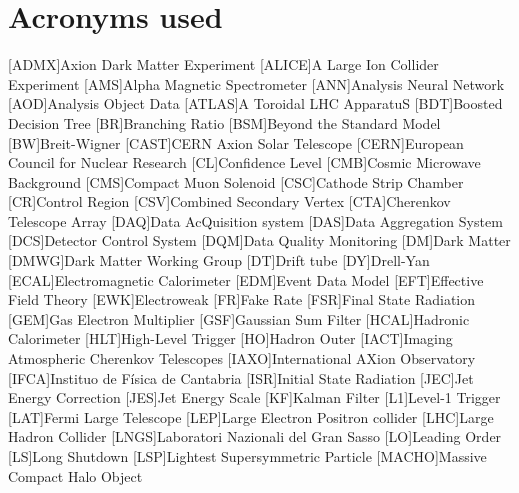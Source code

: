 \documentclass[a4paper, 10pt, openright]{report}
\begin{document}
\newpage

\chapter*{Acronyms used}
\pagestyle{plain}

\begin{multicols}{2}
\begin{acronym}

[ADMX]{Axion Dark Matter Experiment}
[ALICE]{A Large Ion Collider Experiment}
[AMS]{Alpha Magnetic Spectrometer}
[ANN]{Analysis Neural Network}
[AOD]{Analysis Object Data}
[ATLAS]{A Toroidal LHC ApparatuS}
[BDT]{Boosted Decision Tree}
[BR]{Branching Ratio}
[BSM]{Beyond the Standard Model}
[BW]{Breit-Wigner}
[CAST]{CERN Axion Solar Telescope}
[CERN]{European Council for Nuclear Research}
[CL]{Confidence Level}
[CMB]{Cosmic Microwave Background}
[CMS]{Compact Muon Solenoid}
[CSC]{Cathode Strip Chamber}
[CR]{Control Region}
[CSV]{Combined Secondary Vertex}
[CTA]{Cherenkov Telescope Array}
[DAQ]{Data AcQuisition system}
[DAS]{Data Aggregation System}
[DCS]{Detector Control System}
[DQM]{Data Quality Monitoring}
[DM]{Dark Matter}
[DMWG]{Dark Matter Working Group}
[DT]{Drift tube}
[DY]{Drell-Yan}
[ECAL]{Electromagnetic Calorimeter}
[EDM]{Event Data Model}
[EFT]{Effective Field Theory}
[EWK]{Electroweak}
[FR]{Fake Rate}
[FSR]{Final State Radiation}
[GEM]{Gas Electron Multiplier}
[GSF]{Gaussian Sum Filter}
[HCAL]{Hadronic Calorimeter}
[HLT]{High-Level Trigger}
[HO]{Hadron Outer}
[IACT]{Imaging Atmospheric Cherenkov Telescopes}
[IAXO]{International AXion Observatory}
[IFCA]{Instituo de F\'{i}sica de Cantabria}
[ISR]{Initial State Radiation}
[JEC]{Jet Energy Correction}
[JES]{Jet Energy Scale}
[KF]{Kalman Filter}
[L1]{Level-1 Trigger}
[LAT]{Fermi Large Telescope}
[LEP]{Large Electron Positron collider}
[LHC]{Large Hadron Collider}
[LNGS]{Laboratori Nazionali del Gran Sasso}
[LO]{Leading Order}
[LS]{Long Shutdown}
[LSP]{Lightest Supersymmetric Particle}
[MACHO]{Massive Compact Halo Object}

\end{acronym}
\end{multicols}
\end{document}
